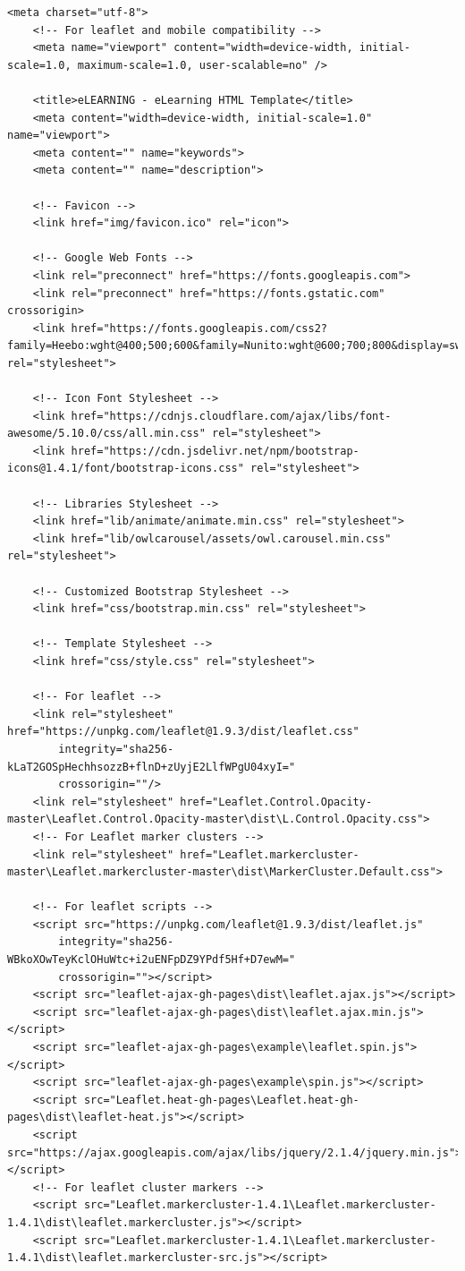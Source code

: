 \documentclass[
]{book}
\begin{document}
\begin{verbatim}
<meta charset="utf-8">
    <!-- For leaflet and mobile compatibility -->
    <meta name="viewport" content="width=device-width, initial-scale=1.0, maximum-scale=1.0, user-scalable=no" />

    <title>eLEARNING - eLearning HTML Template</title>
    <meta content="width=device-width, initial-scale=1.0" name="viewport">
    <meta content="" name="keywords">
    <meta content="" name="description">

    <!-- Favicon -->
    <link href="img/favicon.ico" rel="icon">

    <!-- Google Web Fonts -->
    <link rel="preconnect" href="https://fonts.googleapis.com">
    <link rel="preconnect" href="https://fonts.gstatic.com" crossorigin>
    <link href="https://fonts.googleapis.com/css2?family=Heebo:wght@400;500;600&family=Nunito:wght@600;700;800&display=swap" rel="stylesheet">

    <!-- Icon Font Stylesheet -->
    <link href="https://cdnjs.cloudflare.com/ajax/libs/font-awesome/5.10.0/css/all.min.css" rel="stylesheet">
    <link href="https://cdn.jsdelivr.net/npm/bootstrap-icons@1.4.1/font/bootstrap-icons.css" rel="stylesheet">

    <!-- Libraries Stylesheet -->
    <link href="lib/animate/animate.min.css" rel="stylesheet">
    <link href="lib/owlcarousel/assets/owl.carousel.min.css" rel="stylesheet">

    <!-- Customized Bootstrap Stylesheet -->
    <link href="css/bootstrap.min.css" rel="stylesheet">

    <!-- Template Stylesheet -->
    <link href="css/style.css" rel="stylesheet">

    <!-- For leaflet -->
    <link rel="stylesheet" href="https://unpkg.com/leaflet@1.9.3/dist/leaflet.css"
        integrity="sha256-kLaT2GOSpHechhsozzB+flnD+zUyjE2LlfWPgU04xyI="
        crossorigin=""/>
    <link rel="stylesheet" href="Leaflet.Control.Opacity-master\Leaflet.Control.Opacity-master\dist\L.Control.Opacity.css">
    <!-- For Leaflet marker clusters -->
    <link rel="stylesheet" href="Leaflet.markercluster-master\Leaflet.markercluster-master\dist\MarkerCluster.Default.css">  

    <!-- For leaflet scripts -->
    <script src="https://unpkg.com/leaflet@1.9.3/dist/leaflet.js"
        integrity="sha256-WBkoXOwTeyKclOHuWtc+i2uENFpDZ9YPdf5Hf+D7ewM="
        crossorigin=""></script>
    <script src="leaflet-ajax-gh-pages\dist\leaflet.ajax.js"></script>
    <script src="leaflet-ajax-gh-pages\dist\leaflet.ajax.min.js"></script>
    <script src="leaflet-ajax-gh-pages\example\leaflet.spin.js"></script>
    <script src="leaflet-ajax-gh-pages\example\spin.js"></script> 
    <script src="Leaflet.heat-gh-pages\Leaflet.heat-gh-pages\dist\leaflet-heat.js"></script>
    <script src="https://ajax.googleapis.com/ajax/libs/jquery/2.1.4/jquery.min.js"></script>
    <!-- For leaflet cluster markers -->
    <script src="Leaflet.markercluster-1.4.1\Leaflet.markercluster-1.4.1\dist\leaflet.markercluster.js"></script>
    <script src="Leaflet.markercluster-1.4.1\Leaflet.markercluster-1.4.1\dist\leaflet.markercluster-src.js"></script>
    
\end{verbatim}
\end{document}
